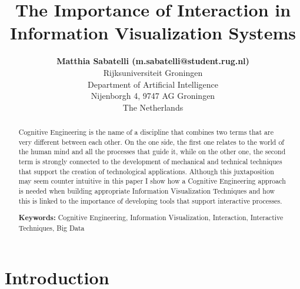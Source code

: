 \documentclass[10p,letterpaper]{article}
\title{The Importance of Interaction in Information Visualization Systems}
\author{{\large \bf Matthia Sabatelli (m.sabatelli@student.rug.nl)} \\
  Rijksuniversiteit Groningen\\Department of Artificial Intelligence\\ Nijenborgh 4,
  9747 AG Groningen\\ The Netherlands}
\begin{document}
\maketitle


\begin{abstract}

Cognitive Engineering is the name of a discipline that combines two terms that are very different between each other. On the one side, the first one relates to the world of the human mind and all the processes that guide it, while on the other one, the second term is strongly connected to the development of mechanical and technical techniques that support the creation of technological applications. Although this juxtaposition may seem counter intuitive in this paper I show how a Cognitive Engineering approach is needed when building appropriate Information Visualization Techniques and how this is linked to the importance of developing tools that support interactive processes.       

\textbf{Keywords:} 
Cognitive Engineering, Information Visualization, Interaction, Interactive Techniques, Big Data
\end{abstract}


\section{Introduction}
\end{document}
